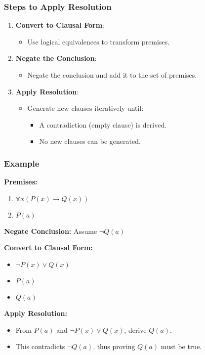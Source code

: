 \documentclass[aspectratio=169]{beamer}
\begin{document}
\begin{frame}[fragile]
    \frametitle{Steps to Apply Resolution}
    \begin{enumerate}
        \item \textbf{Convert to Clausal Form}:
        \begin{itemize}
            \item Use logical equivalences to transform premises.
        \end{itemize}
        
        \item \textbf{Negate the Conclusion}:
        \begin{itemize}
            \item Negate the conclusion and add it to the set of premises.
        \end{itemize}
        
        \item \textbf{Apply Resolution}:
        \begin{itemize}
            \item Generate new clauses iteratively until:
            \begin{itemize}
                \item A contradiction (empty clause) is derived.
                \item No new clauses can be generated.
            \end{itemize}
        \end{itemize}
    \end{enumerate}
\end{frame}

\begin{frame}[fragile]
    \frametitle{Example}
    \textbf{Premises:}
    \begin{enumerate}
        \item $ \forall x (P(x) \rightarrow Q(x)) $
        \item $ P(a) $
    \end{enumerate}
    
    \textbf{Negate Conclusion:} Assume $ ¬Q(a) $

    \textbf{Convert to Clausal Form:}
    \begin{itemize}
        \item $ ¬P(x) \lor Q(x) $ 
        \item $ P(a) $ 
        \item $ Q(a) $ 
    \end{itemize}

    \textbf{Apply Resolution:}
    \begin{itemize}
        \item From $ P(a) $ and $ ¬P(x) \lor Q(x) $, derive $ Q(a) $.
        \item This contradicts $ ¬Q(a) $, thus proving $ Q(a) $ must be true.
    \end{itemize}
\end{frame}
\end{document}
